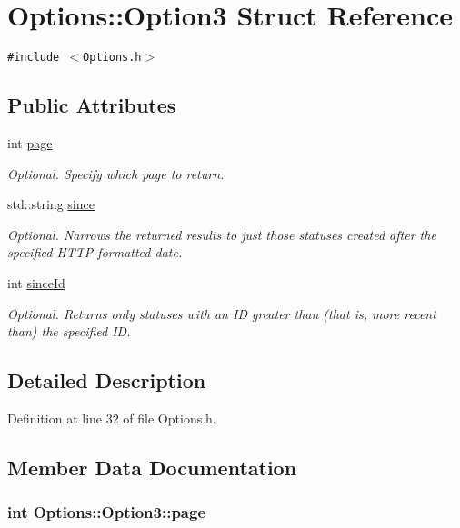 \hypertarget{structOptions_1_1Option3}{
\section{Options::Option3 Struct Reference}
\label{structOptions_1_1Option3}
}
{\tt \#include $<$Options.h$>$}

\subsection*{Public Attributes}
\begin{CompactItemize}
\item 
int \hyperlink{structOptions_1_1Option3_2693023825d1d705a61b21e497603522}{page}
\begin{CompactList}\small\item\em Optional. Specify which page to return. \item\end{CompactList}\item 
std::string \hyperlink{structOptions_1_1Option3_1be2f3f2fb06e279a8f6c7244903765a}{since}
\begin{CompactList}\small\item\em Optional. Narrows the returned results to just those statuses created after the specified HTTP-formatted date. \item\end{CompactList}\item 
int \hyperlink{structOptions_1_1Option3_1584db69d6254a839da308f1924fc45b}{sinceId}
\begin{CompactList}\small\item\em Optional. Returns only statuses with an ID greater than (that is, more recent than) the specified ID. \item\end{CompactList}\end{CompactItemize}


\subsection{Detailed Description}


Definition at line 32 of file Options.h.

\subsection{Member Data Documentation}
\hypertarget{structOptions_1_1Option3_2693023825d1d705a61b21e497603522}{
\subsubsection{\setlength{\rightskip}{0pt plus 5cm}int {\bf Options::Option3::page}}}
\label{structOptions_1_1Option3_2693023825d1d705a61b21e497603522}


